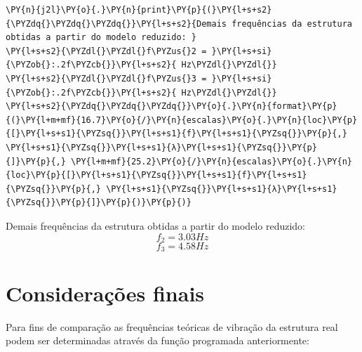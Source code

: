     \begin{tcolorbox}[breakable, size=fbox, boxrule=1pt, pad at break*=1mm,colback=cellbackground, colframe=cellborder]
\begin{Verbatim}[commandchars=\\\{\}]
\PY{n}{j2l}\PY{o}{.}\PY{n}{print}\PY{p}{(}\PY{l+s+s2}{\PYZdq{}\PYZdq{}\PYZdq{}}\PY{l+s+s2}{Demais frequências da estrutura obtidas a partir do modelo reduzido: }
\PY{l+s+s2}{\PYZdl{}\PYZdl{}f\PYZus{}2 = }\PY{l+s+si}{\PYZob{}:.2f\PYZcb{}}\PY{l+s+s2}{ Hz\PYZdl{}\PYZdl{}}
\PY{l+s+s2}{\PYZdl{}\PYZdl{}f\PYZus{}3 = }\PY{l+s+si}{\PYZob{}:.2f\PYZcb{}}\PY{l+s+s2}{ Hz\PYZdl{}\PYZdl{}}
\PY{l+s+s2}{\PYZdq{}\PYZdq{}\PYZdq{}}\PY{o}{.}\PY{n}{format}\PY{p}{(}\PY{l+m+mf}{16.7}\PY{o}{/}\PY{n}{escalas}\PY{o}{.}\PY{n}{loc}\PY{p}{[}\PY{l+s+s1}{\PYZsq{}}\PY{l+s+s1}{f}\PY{l+s+s1}{\PYZsq{}}\PY{p}{,} \PY{l+s+s1}{\PYZsq{}}\PY{l+s+s1}{λ}\PY{l+s+s1}{\PYZsq{}}\PY{p}{]}\PY{p}{,} \PY{l+m+mf}{25.2}\PY{o}{/}\PY{n}{escalas}\PY{o}{.}\PY{n}{loc}\PY{p}{[}\PY{l+s+s1}{\PYZsq{}}\PY{l+s+s1}{f}\PY{l+s+s1}{\PYZsq{}}\PY{p}{,} \PY{l+s+s1}{\PYZsq{}}\PY{l+s+s1}{λ}\PY{l+s+s1}{\PYZsq{}}\PY{p}{]}\PY{p}{)}\PY{p}{)}
\end{Verbatim}
\end{tcolorbox}

    Demais frequências da estrutura obtidas a partir do modelo reduzido: 
$$f_2 = 3.03 Hz$$
$$f_3 = 4.58 Hz$$


    
    \hypertarget{considerauxe7uxf5es-finais}{%
\section{Considerações finais}\label{considerauxe7uxf5es-finais}}

    Para fins de comparação as frequências teóricas de vibração da estrutura
real podem ser determinadas através da função programada anteriormente:

